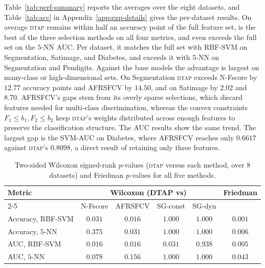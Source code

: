 \documentclass[]{interact}
\theoremstyle{plain}
\theoremstyle{definition}
\theoremstyle{remark}
\newcommand{\dtap}{\textsc{dtap}}
\begin{document}
Table~\ref{tab:perf-summary} reports the averages over the eight datasets, and Table~\ref{tab:acc} in Appendix~\ref{app:exp-details} gives the per-dataset results. On average \dtap{} remains within half an accuracy point of the full feature set, is the best of the three selection methods on all four metrics, and even exceeds the full set on the $5$-NN AUC. Per dataset, it matches the full set with RBF-SVM on Segmentation, Satimage, and Diabetes, and exceeds it with $5$-NN on Segmentation and Pendigits. Against the base models the advantage is largest on many-class or high-dimensional sets. On Segmentation \dtap{} exceeds N-Fscore by $12.77$ accuracy points and AFRSFCV by $14.50$, and on Satimage by $2.02$ and $8.70$. AFRSFCV's gaps stem from its overly sparse selections, which discard features needed for multi-class discrimination, whereas the convex constraints $F_1\le b_1,F_2\le b_2$ keep \dtap's weights distributed across enough features to preserve the classification structure. The AUC results show the same trend. The largest gap is the SVM-AUC on Diabetes, where AFRSFCV reaches only $0.6617$ against \dtap's $0.8098$, a direct result of retaining only three features.
\begin{table}[htbp]
\centering\small
\caption{Two-sided Wilcoxon signed-rank $p$-values (\dtap{} versus each method, over $8$ datasets) and Friedman $p$-values for all five methods.}\label{tab:wilcoxon}
\begin{tabular}{l cccc c}
\toprule
\multirow{2}{*}{Metric} & \multicolumn{4}{c}{Wilcoxon (DTAP vs)} & \multirow{2}{*}{Friedman} \\
\cmidrule(lr){2-5}
                  & N-Fscore & AFRSFCV & SG-const & SG-dyn  &         \\
\midrule
Accuracy, RBF-SVM & $0.031$  & $0.016$ & $1.000$  & $1.000$ & $0.001$ \\
Accuracy, $5$-NN  & $0.375$  & $0.031$ & $1.000$  & $1.000$ & $0.006$ \\
AUC, RBF-SVM      & $0.016$  & $0.016$ & $0.031$  & $0.938$ & $0.005$ \\
AUC, $5$-NN       & $0.078$  & $0.156$ & $1.000$  & $1.000$ & $0.043$ \\
\bottomrule
\end{tabular}
\end{table}
\end{document}
